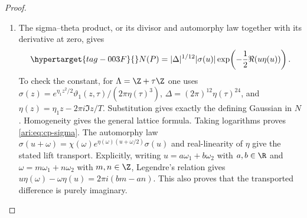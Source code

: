 \begin{proof}
\begin{enumerate}[label=\arabic*.,leftmargin=*]
\item The sigma--theta product, or its divisor and automorphy law
together with its derivative at zero, gives
\begin{equation}\hypertarget{tag-003F}{}\label{ari:eq:cp-klein}
 N(P)=|\Delta|^{1/12}|\sigma(u)|
                   \exp\!\left(-\frac12\Re(u\eta(u))\right).
\end{equation}
To check the constant, for $\Lambda=\Z+\tau\Z$ one uses
$\sigma(z)=e^{\eta_1z^2/2}\vartheta_1(z,\tau)/(2\pi\eta(\tau)^3)$,
$\Delta=(2\pi)^{12}\eta(\tau)^{24}$, and
$\eta(z)=\eta_1z-2\pi i\Im z/T$. Substitution gives exactly
the defining Gaussian in $N$. Homogeneity gives the general
lattice formula. Taking logarithms proves \eqref{ari:eq:cp-sigma}.
The automorphy law
$\sigma(u+\omega)=\chi(\omega)
 e^{\eta(\omega)(u+\omega/2)}\sigma(u)$ and real-linearity of
$\eta$ give the stated lift transport. Explicitly, writing
$u=a\omega_1+b\omega_2$ with $a,b\in\R$ and
$\omega=m\omega_1+n\omega_2$ with $m,n\in\Z$, Legendre's
relation gives
$u\eta(\omega)-\omega\eta(u)=2\pi i(bm-an)$.
This also proves that the transported difference is purely imaginary.


\end{enumerate}
\end{proof}
